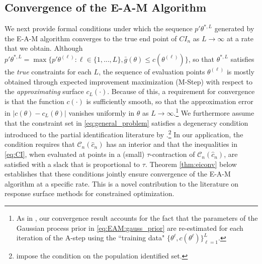 \documentclass[letterpaper,11pt]{article}
\theoremstyle{myplain}
\theoremstyle{mydefinition}
\theoremstyle{myremark}
\renewcommand{\cite}{\citet}
\newcommand{\cC}{\mathcal{C}}
\numberwithin{equation}{section}
\numberwithin{figure}{section}
\begin{document}
\subsection{Convergence of the E-A-M Algorithm}
\label{sec:main:conv}
We next provide formal conditions under which the sequence $p'\theta^{*,L}$ generated by the E-A-M algorithm converges to the true end point of $CI_n$ as $L\to\infty$ at a rate that we obtain.
Although $p'\theta^{*,L}=\max\{p'\theta^{(\ell)}:\ell \in\{1,..., L\}, \bar g(\theta)\le c(\theta^{(\ell)})\}$, so that $\theta^{*,L}$ satisfies the \emph{true} constraints for each $L$, the sequence of evaluation points $\theta^{(\ell)}$ is mostly obtained through expected improvement maximization (M-Step) with respect to the \emph{approximating} surface $c_L(\cdot)$.
Because of this, a requirement for convergence is that the function $c(\cdot)$ is sufficiently smooth, so that the approximation error in $|c(\theta)-c_L(\theta)|$ vanishes uniformly in $\theta$ as $L\to\infty$.\footnote{As in \cite{Bull_Convergence_2011}, our convergence result accounts for the fact that the parameters of the Gaussian process prior in \eqref{eq:EAM:gauss_prior} are re-estimated for each iteration of the A-step using the ``training data" $\{\theta^\ell,c(\theta^\ell)\}_{\ell=1}^L$.}
We furthermore assume that the constraint set in \eqref{eq:general_problem} satisfies a degeneracy condition introduced to the partial identification literature by \cite[Condition C.3]{CHT}.\footnote{\cite[eq. (4.6)]{CHT} impose the condition on the population identified set.}
In our application, the condition requires that $\cC_n(\hat{c}_n)$ has an interior and that the inequalities in \eqref{eq:CI}, when evaluated at points in a (small) $\tau$-contraction of $\cC_n(\hat{c}_n)$, are satisfied with a slack that is proportional to $\tau$.
Theorem \ref{thm:eiconv} below establishes that these conditions jointly ensure convergence of the E-A-M algorithm at a specific rate. This is a novel contribution to the literature on response surface methods for constrained optimization.
\end{document}
